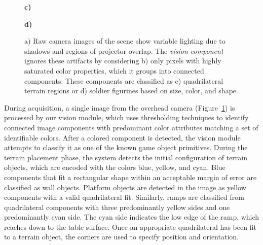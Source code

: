 \documentclass[review]{vgtc}                 %
\begin{document}
\begin{figure}[t]
\begin{center}
 \begin{minipage}{\picwidth}\textcolor[rgb]{1,1,1}{\hspace{0.02in} {\bf              c)}} \end{minipage}
 \begin{minipage}{\picwidth}\textcolor[rgb]{1,1,1}{\hspace{0.02in} {\bf              d)}} \end{minipage}
\end{center}
\vspace{-0.15in}
\caption[ARmy Object Detection]{a) Raw camera images of the scene show
  variable lighting due to shadows and regions of projector overlap.
  The \emph{vision component} ignores these artifacts by considering
  b) only pixels with highly saturated color properties, which it
  groups into connected components. These components are classified as
  c) quadrilateral terrain regions or d) soldier figurines based on
  size, color, and shape.}
\label{FIGURE:ARmyObjectDetection}
\vspace{-0.1in}
\end{figure}

During acquisition, a single image from the overhead camera
(Figure~\ref{FIGURE:ARmyObjectDetection}) is processed by our vision
module, which uses thresholding techniques to identify connected image
components with predominant color attributes matching a set of
identifiable colors. 
%
%
After a colored component is detected, the vision module attempts to
classify it as one of the known game object primitives.  During the
terrain placement phase, the system detects the initial configuration
of terrain objects, which are encoded with the colors blue, yellow,
and cyan.  Blue components that fit a rectangular shape within an
acceptable margin of error are classified as wall objects.  Platform
objects are detected in the image as yellow components with a valid
quadrilateral fit.  Similarly, ramps are classified from quadrilateral
components with three predominantly yellow sides and one predominantly
cyan side.  The cyan side indicates the low edge of the ramp, which
reaches down to the table surface.  Once an appropriate quadrilateral
has been fit to a terrain object, the corners are used to specify
position and orientation.
\end{document}
